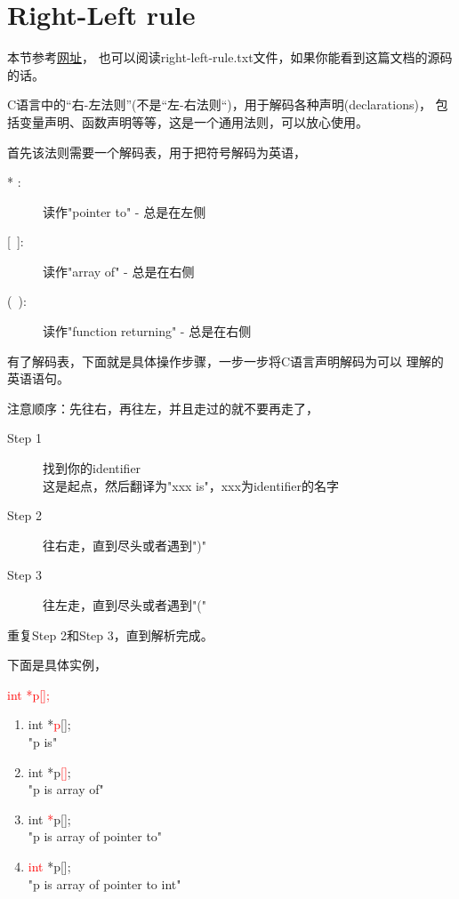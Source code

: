 \section[Right-Left rule]{Right-Left rule}
本节参考\href{http://ieng9.ucsd.edu/~cs30x/rt_lt.rule.html}{网址}，
也可以阅读right-left-rule.txt文件，如果你能看到这篇文档的源码的话。

C语言中的“右-左法则”(不是“左-右法则“)，用于解码各种声明(declarations)，
包括变量声明、函数声明等等，这是一个通用法则，可以放心使用。

首先该法则需要一个解码表，用于把符号解码为英语，
\begin{description}
  \item[{* }:] 读作"pointer to" - 总是在左侧
  \item[{[~]}:] 读作"array of" - 总是在右侧
  \item[{(~)}:] 读作"function returning" - 总是在右侧
\end{description}

有了解码表，下面就是具体操作步骤，一步一步将C语言声明解码为可以
理解的英语语句。

注意顺序：先往右，再往左，并且走过的就不要再走了，
\begin{description}
  \item[Step 1] 找到你的identifier\\
  这是起点，然后翻译为"xxx is"，xxx为identifier的名字
  \item[Step 2] 往右走，直到尽头或者遇到")"
  \item[Step 3] 往左走，直到尽头或者遇到"("
\end{description}
重复Step 2和Step 3，直到解析完成。

下面是具体实例，

\hspace{1cm}\textcolor{red}{int *p[];}

\begin{enumerate}
  \item int *\textcolor{red}{p}[];\\
  "p is"
  \item int *p\textcolor{red}{[]};\\
  "p is array of"
  \item int \textcolor{red}{*}p[];\\
  "p is array of pointer to"
  \item \textcolor{red}{int} *p[];\\
  "p is array of pointer to int"
\end{enumerate}

